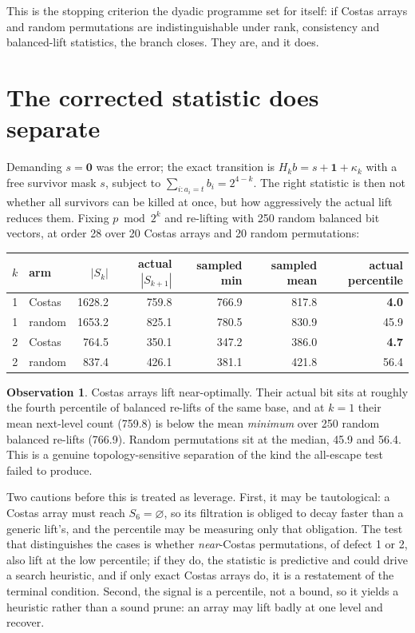 \documentclass[11pt,a4paper,oneside]{report}
\theoremstyle{definition}
\newtheorem{observation}[theorem]{Observation}
\begin{document}
This is the stopping criterion the dyadic programme set for itself: if Costas
arrays and random permutations are indistinguishable under rank, consistency and
balanced-lift statistics, the branch closes. They are, and it does. \section{The corrected statistic does separate}
\label{p7-sec:muk}

Demanding $s=\mathbf0$ was the error; the exact transition is
$H_k b = s+\mathbf1+\kappa_k$ with a free survivor mask $s$, subject to
$\sum_{i:a_i=t}b_i = 2^{4-k}$. The right statistic is then not whether all
survivors can be killed at once, but how aggressively the actual lift reduces
them. Fixing $p \bmod 2^k$ and re-lifting with 250 random balanced bit vectors,
at order 28 over 20 Costas arrays and 20 random permutations:

\begin{center}
\begin{tabular}{@{}rlrrrrr@{}}
\toprule
$k$ & arm & $|S_k|$ & actual $|S_{k+1}|$ & sampled min & sampled mean & actual percentile \\
\midrule
1 & Costas & 1628.2 & 759.8 & 766.9 & 817.8 & \textbf{4.0} \\
1 & random & 1653.2 & 825.1 & 780.5 & 830.9 & 45.9 \\
2 & Costas & 764.5 & 350.1 & 347.2 & 386.0 & \textbf{4.7} \\
2 & random & 837.4 & 426.1 & 381.1 & 421.8 & 56.4 \\
\bottomrule
\end{tabular}
\end{center}

\begin{observation}
\label{p7-obs:muk}
Costas arrays lift near-optimally. Their actual bit sits at roughly the fourth
percentile of balanced re-lifts of the same base, and at $k=1$ their mean
next-level count (759.8) is below the mean \emph{minimum} over 250 random
balanced re-lifts (766.9). Random permutations sit at the median, 45.9 and 56.4.
This is a genuine topology-sensitive separation of the kind the all-escape test
failed to produce.
\end{observation}

Two cautions before this is treated as leverage. First, it may be tautological:
a Costas array must reach $S_6=\varnothing$, so its filtration is obliged to
decay faster than a generic lift's, and the percentile may be measuring only that
obligation. The test that distinguishes the cases is whether \emph{near}-Costas
permutations, of defect 1 or 2, also lift at the low percentile; if they do, the
statistic is predictive and could drive a search heuristic, and if only exact
Costas arrays do, it is a restatement of the terminal condition. Second, the
signal is a percentile, not a bound, so it yields a heuristic rather than a sound
prune: an array may lift badly at one level and recover.
\end{document}
